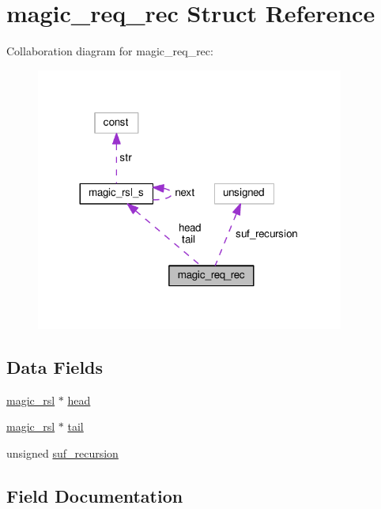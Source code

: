\hypertarget{structmagic__req__rec}{}\section{magic\+\_\+req\+\_\+rec Struct Reference}
\label{structmagic__req__rec}


Collaboration diagram for magic\+\_\+req\+\_\+rec\+:
\nopagebreak
\begin{figure}[H]
\begin{center}
\leavevmode
\includegraphics[width=287pt]{structmagic__req__rec__coll__graph}
\end{center}
\end{figure}
\subsection*{Data Fields}
\begin{DoxyCompactItemize}
\item 
\hyperlink{mod__mime__magic_8c_ad47b0587641db3e967b232c3a8c8d9de}{magic\+\_\+rsl} $\ast$ \hyperlink{structmagic__req__rec_a7003ab97a5260aa7d027dd929739a715}{head}
\item 
\hyperlink{mod__mime__magic_8c_ad47b0587641db3e967b232c3a8c8d9de}{magic\+\_\+rsl} $\ast$ \hyperlink{structmagic__req__rec_a6a06479eda3d368fc68464abd82bae3b}{tail}
\item 
unsigned \hyperlink{structmagic__req__rec_adb96e65e4fd3449b2f0f610b3534b90a}{suf\+\_\+recursion}
\end{DoxyCompactItemize}


\subsection{Field Documentation}
